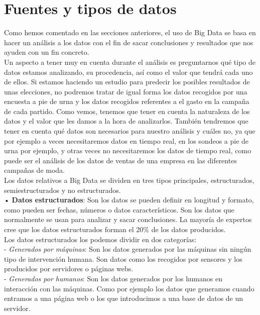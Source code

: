 \section{Fuentes y tipos de datos}

Como hemos comentado en las secciones anteriores, el uso de Big Data se basa en hacer un análisis a los datos con el fin de sacar conclusiones y resultados que nos ayuden con un fin concreto.\\

Un aspecto a tener muy en cuenta durante el análisis es preguntarnos qué tipo de datos estamos analizando, su procedencia, así como el valor que tendrá cada uno de ellos. Si estamos haciendo un estudio para predecir los posibles resultados de unas elecciones, no podremos tratar de igual forma los datos recogidos por una encuesta a pie de urna y los datos recogidos referentes a el gasto en la campaña de cada partido. Como vemos, tenemos que tener en cuenta la naturaleza de los datos y el valor que les damos a la hora de analizarlos. También tendremos que tener en cuenta qué datos son necesarios para nuestro análisis y cuáles no, ya que por ejemplo a veces necesitaremos datos en tiempo real,  en los sondeos a pie de urna  por ejemplo, y otras veces no necesitaremos los datos de tiempo real, como puede ser el análisis de los datos de ventas de una empresa en las diferentes campañas de moda.\\

Los datos relativos a Big Data se dividen en tres tipos principales, estructurados, semiestructurados y no estructurados.\\

•	\textbf{Datos estructurados}: Son los datos se pueden definir en longitud y formato, como pueden ser fechas, números o datos característicos. Son los datos que normalmente se usan para analizar y sacar conclusiones. La mayoría de expertos cree que los datos estructurados forman el 20\% de los datos producidos.\\

Los datos estructurados los podemos dividir en dos categorías:\\

-	\emph{Generados por máquinas}: Son los datos generados por las máquinas sin ningún tipo de intervención humana. Son datos como los recogidos por sensores y los producidos por servidores o páginas webs.\\

-	\emph{Generados por humanos}: Son los datos generados por los humanos en interacción con las máquinas. Como por ejemplo los datos que generamos cuando entramos a una página web o los que introducimos a una base de datos de un servidor.\\

